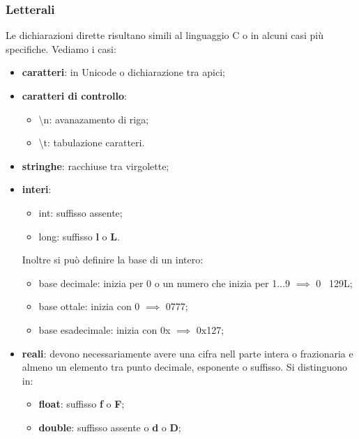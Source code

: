 \documentclass{subfiles}
\begin{document}
    \subsubsection{Letterali}
    Le dichiarazioni dirette risultano simili al linguaggio C o in alcuni casi più specifiche. Vediamo i casi:
    \begin{itemize}
        \item \textbf{caratteri}: in Unicode o dichiarazione tra apici;
        \item \textbf{caratteri di controllo}:   
        \begin{itemize}
            \item \textbackslash n: avanazamento di riga;
            \item \textbackslash t: tabulazione caratteri.
        \end{itemize} 
        \item \textbf{stringhe}: racchiuse tra virgolette;
        \item \textbf{interi}:
        \begin{itemize}
            \item int: suffisso assente;
            \item long: suffisso \textbf{l} o \textbf{L}.
        \end{itemize}
        Inoltre si può definire la base di un intero:
        \begin{itemize}
            \item base decimale: inizia per 0 o un numero che inizia per 1...9 \(\implies\) 0 \ 129L;
            \item base ottale: inizia con 0 \(\implies\) 0777;
            \item base esadecimale: inizia con 0x \(\implies\) 0x127;
        \end{itemize}
        \item \textbf{reali}: devono necessariamente avere una cifra nell parte intera o frazionaria  e almeno un elemento tra punto decimale, 
        esponente o suffisso. Si distinguono in: 
        \begin{itemize}
            \item \textbf{float}: suffisso \textbf{f} o \textbf{F};
            \item \textbf{double}: suffisso assente o \textbf{d} o \textbf{D};
        \end{itemize}
    
    \end{itemize}
    \clearpage
\end{document}
